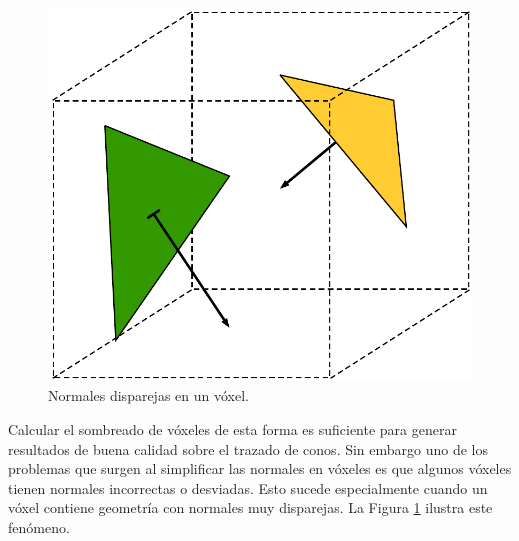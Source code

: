 \begin{figure}
	\centering
	\captionsetup{justification=centering}
	\includegraphics[width=\linewidth]{media/gimped_normals.pdf}
	\caption{Normales disparejas en un vóxel.}
	\label{fig:error_normals}
\end{figure}
Calcular el sombreado de vóxeles de esta forma es suficiente para generar resultados de buena calidad sobre el trazado de conos. Sin embargo uno de los problemas que surgen al simplificar las normales en vóxeles es que algunos vóxeles tienen normales incorrectas o desviadas. Esto sucede especialmente cuando un vóxel contiene geometría con normales muy disparejas. La Figura \ref{fig:error_normals} ilustra este fenómeno.

